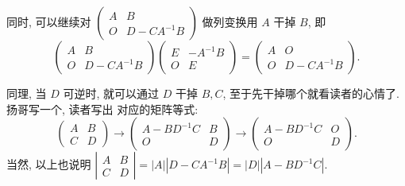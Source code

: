 \documentclass{article}
\begin{document}
同时, 可以继续对 $\left(\begin{array}{cc}A & B \\ O & D-C A^{-1} B\end{array}\right)$ 做列变换用 $A$ 干掉 $B$, 即
\begin{equation*}
    \left(\begin{array}{cc}
        A & B            \\
        O & D-C A^{-1} B
    \end{array}\right)\left(\begin{array}{cc}
        E & -A^{-1} B \\
        O & E
    \end{array}\right)=\left(\begin{array}{cc}
        A & O            \\
        O & D-C A^{-1} B
    \end{array}\right).
\end{equation*}

同理, 当 $D$ 可逆时, 就可以通过 $D$ 干掉 $B, C$, 至于先干掉哪个就看读者的心情了. 扬哥写一个, 读者写出
对应的矩阵等式:
\begin{equation*}
    \left(\begin{array}{cc}
        A & B \\
        C & D
    \end{array}\right) \longrightarrow\left(\begin{array}{cc}
        A-B D^{-1} C & B \\
        O            & D
    \end{array}\right) \longrightarrow\left(\begin{array}{cc}
        A-B D^{-1} C & O \\
        O            & D
    \end{array}\right).
\end{equation*}
当然, 以上也说明 $\left|\begin{array}{ll}A & B \\ C & D\end{array}\right|=|A|\left|D-C A^{-1} B\right|=|D|\left|A-B D^{-1} C\right| .$
\end{document}
